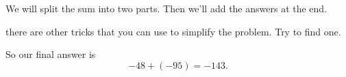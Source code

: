 We will split the sum into two parts.
Then we'll add the answers at the end.

 there are other tricks that you can use to simplify the problem.
Try to find one.





So our final answer is
\[
    -48 + (-95) = \boxed{-143}.
\]
